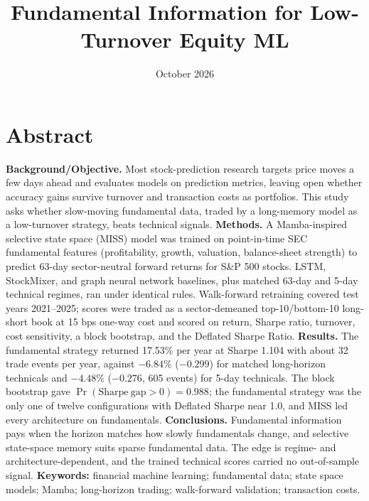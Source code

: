 \documentclass[12pt]{article}
\title{Fundamental Information for Low-Turnover Equity ML}
\date{October 2026}
\begin{document}
\maketitle
\section*{Abstract}
\textbf{Background/Objective. }Most stock-prediction research targets price moves a few days ahead and evaluates models on prediction metrics, leaving open whether accuracy gains survive turnover and transaction costs as portfolios. This study asks whether slow-moving fundamental data, traded by a long-memory model as a low-turnover strategy, beats technical signals. \textbf{Methods. }A Mamba-inspired selective state space (MISS) model was trained on point-in-time SEC fundamental features (profitability, growth, valuation, balance-sheet strength) to predict 63-day sector-neutral forward returns for S\&P 500 stocks. LSTM, StockMixer, and graph neural network baselines, plus matched 63-day and 5-day technical regimes, ran under identical rules. Walk-forward retraining covered test years 2021--2025; scores were traded as a sector-demeaned top-10/bottom-10 long-short book at 15 bps one-way cost and scored on return, Sharpe ratio, turnover, cost sensitivity, a block bootstrap, and the Deflated Sharpe Ratio. \textbf{Results. }The fundamental strategy returned 17.53\% per year at Sharpe 1.104 with about 32 trade events per year, against $-6.84\%$ ($-0.299$) for matched long-horizon technicals and $-4.48\%$ ($-0.276$, 605 events) for 5-day technicals. The block bootstrap gave $\Pr(\mathrm{Sharpe~gap} > 0) = 0.988$; the fundamental strategy was the only one of twelve configurations with Deflated Sharpe near 1.0, and MISS led every architecture on fundamentals. \textbf{Conclusions. }Fundamental information pays when the horizon matches how slowly fundamentals change, and selective state-space memory suits sparse fundamental data. The edge is regime- and architecture-dependent, and the trained technical scores carried no out-of-sample signal. \textbf{Keywords: }financial machine learning; fundamental data; state space models; Mamba; long-horizon trading; walk-forward validation; transaction costs.
\end{document}
